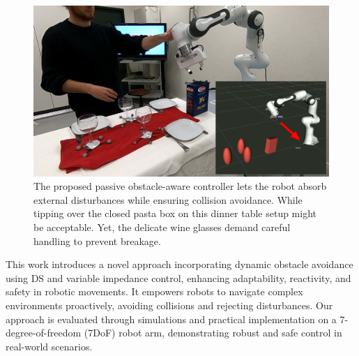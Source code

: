 \begin{figure}
\centerline{\includegraphics[width=1.0\columnwidth]{figures/robot_arm_table_avoidance}}
\caption{
The proposed passive obstacle-aware controller lets the robot absorb external disturbances while ensuring collision avoidance. 
While tipping over the closed pasta box on this dinner table setup might be acceptable. Yet, the delicate wine glasses demand careful handling to prevent breakage.
}
\label{fig:table_avoidance_with_obstacle}
\end{figure}

This work introduces a novel approach incorporating dynamic obstacle avoidance using DS and variable impedance control, enhancing adaptability, reactivity, and safety in robotic movements. It empowers robots to navigate complex environments proactively, avoiding collisions and rejecting disturbances. Our approach is evaluated through simulations and practical implementation on a 7-degree-of-freedom (7DoF) robot arm, demonstrating robust and safe control in real-world scenarios.

